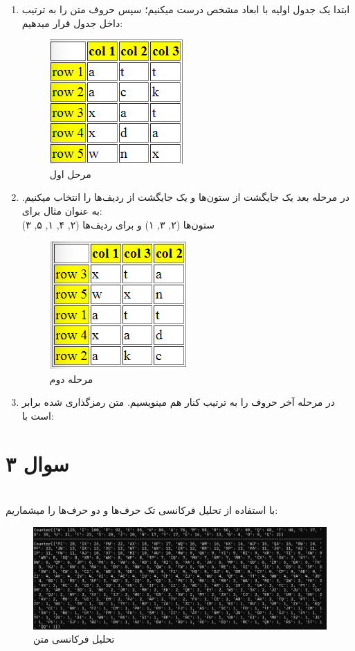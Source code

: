 \documentclass{article}
\begin{document}
\begin{enumerate}
\item ابتدا یک جدول اولیه با ابعاد مشخص درست میکنیم؛ سپس حروف متن را به ترتیب داخل جدول قرار میدهیم:
\begin{figure}[h]
\centering
\includegraphics{2.png}
\caption{مرحل اول }
\label{fig2}
\end{figure}

\item در مرحله بعد یک جایگشت از ستون‌ها و یک جایگشت از ردیف‌ها را انتخاب میکنیم. به عنوان مثال برای:\\ ستون‌ها (۲, ۳, ۱) و برای ردیف‌ها (۲, ۴, ۱, ۵, ۳)
\begin{figure}[h]
\centering
\includegraphics{3.png}
\caption{مرحله دوم }
\label{fig3}
\end{figure}
\item در مرحله آخر حروف را به ترتیب کنار هم مینویسیم. متن رمزگذاری شده برابر است با:\\
\end{enumerate}
\newpage
\section*{سوال ۳}
\leavevmode \\
با استفاده از تحلیل فرکانسی تک حرف‌ها و دو حرف‌ها را میشماریم:\\
\begin{figure}[h]
\centering
\includegraphics[width=1.0\textwidth]{4.png}
\caption{تحلیل فرکانسی متن}
\end{figure}
\end{document}
